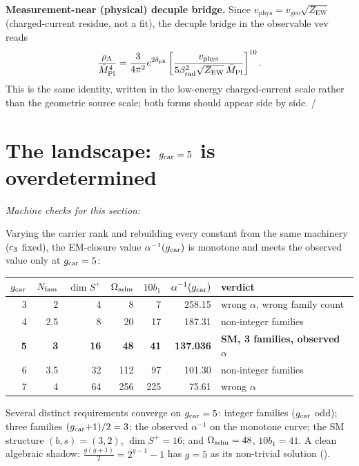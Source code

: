 \noindent\textbf{Measurement-near (physical) decuple bridge.} Since $v_{\mathrm{phys}}=v_{\mathrm{geo}}\sqrt{Z_{\mathrm{EW}}}$
(charged-current residue, not a fit), the decuple bridge in the observable vev reads
\begin{equation}
  \frac{\rho_\Lambda}{\bar M_{\mathrm{Pl}}^4}=\frac{3}{4\pi^2}e^{2\delta_{\mathrm{ph}}}
  \left[\frac{v_{\mathrm{phys}}}{5\beta_{\mathrm{rad}}^2\sqrt{Z_{\mathrm{EW}}}\,\bar M_{\mathrm{Pl}}}\right]^{10}.
\end{equation}
This is the same identity, written in the low-energy charged-current scale rather than the geometric
source scale; both forms should appear side by side. \mE/\mC

\section{The landscape: $g_{\mathrm{car}}=5$ is overdetermined}
\noindent\emph{Machine checks for this section:}  


Varying the carrier rank and rebuilding every constant from the same machinery ($c_3$ fixed),
the EM-closure value $\alpha^{-1}(g_{\mathrm{car}})$ is monotone and meets the observed value only at $g_{\mathrm{car}}=5$:
\begin{center}\small
\begin{tabular}{@{}r r r r r r l@{}}
\toprule
$g_{\mathrm{car}}$ & $N_{\mathrm{fam}}$ & $\dim S^+$ & $\Omega_{\mathrm{adm}}$ & $10b_1$ & $\alpha^{-1}(g_{\mathrm{car}})$ & verdict \\
\midrule
3 & 2 & 4 & 8 & 7 & 258.15 & wrong $\alpha$, wrong family count \\
4 & 2.5 & 8 & 20 & 17 & 187.31 & non-integer families \\
\textbf{5} & \textbf{3} & \textbf{16} & \textbf{48} & \textbf{41} & \textbf{137.036} & \textbf{SM, 3 families, observed $\alpha$} \\
6 & 3.5 & 32 & 112 & 97 & 101.30 & non-integer families \\
7 & 4 & 64 & 256 & 225 & 75.61 & wrong $\alpha$ \\
\bottomrule
\end{tabular}
\end{center}
Several distinct requirements converge on $g_{\mathrm{car}}=5$: integer families ($g_{\mathrm{car}}$ odd); three families
$(g_{\mathrm{car}}{+}1)/2=3$; the observed $\alpha^{-1}$ on the monotone curve; the SM structure $(b,s)=(3,2)$,
$\dim S^+=16$; and $\Omega_{\mathrm{adm}}=48$, $10b_1=41$. A clean algebraic shadow:
$\tfrac{g(g+1)}{2}=2^{g-1}-1$ has $g=5$ as its non-trivial solution (\mC).

